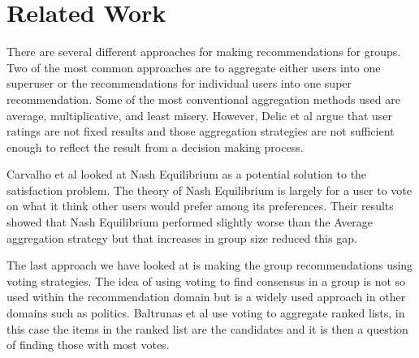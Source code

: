 \section{Related Work} \label{in:related_work}

There are several different approaches for making recommendations for groups. Two of the most common approaches are to aggregate either users into one superuser or the recommendations for individual users into one super recommendation\cite{recsyshandbookagreggation}\cite{deCampos2009}\cite{Christensen201114127}. Some of the most conventional aggregation methods used are average, multiplicative, and least misery. However, Delic et al argue that user ratings are not fixed results and those aggregation strategies are not sufficient enough to reflect the result from a decision making process\cite{aggregationnotenough}.

Carvalho et al looked at Nash Equilibrium as a potential solution to the satisfaction problem\cite{nashequilibrium}. The theory of Nash Equilibrium is largely for a user to vote on what it think other users would prefer among its preferences. Their results showed that Nash Equilibrium performed slightly worse than the Average aggregation strategy but that increases in group size reduced this gap.

The last approach we have looked at is making the group recommendations using voting strategies\cite{baltrunas}\cite{Popescu2013}. The idea of using voting to find consensus in a group is not so used within the recommendation domain but is a widely used approach in other domains such as politics. Baltrunas et al use voting to aggregate ranked lists, in this case the items in the ranked list are the candidates and it is then a question of finding those with most votes\cite{baltrunas}.






